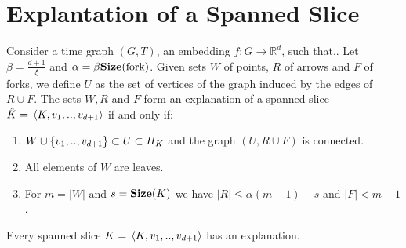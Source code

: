  \section{Explantation of a Spanned Slice}


  \begin{definition}
    Consider a time graph $(G,T)$, an embedding $f \colon G \rightarrow \mathbb{R}^{d}$, such that.. Let $\beta = \frac{d+1}{\xi}$ and $\alpha = \beta \mathbf{Size}(\text{fork})$. Given sets $W$ of points, $R$ of arrows and $F$ of forks, we define $U$ as the set of vertices of the graph induced by the edges of $R \cup F$. The sets $W,R$ and $F$ form an explanation of a spanned slice $\hat{K} = \expval*{ K, v_{1}, .., v_{d+1}}$ if and only if: 
    \begin{enumerate}
      \item $W \cup \{v_{1} ,.., v_{d+1}\} \subset U \subset H_{K}$ and the graph $(U, R\cup F)$ is connected. 
      \item All elements of $W$ are leaves. 
      \item For $m = |W|$ and $s=\mathbf{Size}(K)$ we have $|R| \le \alpha (m-1) - s $ and $|F| < m -1 $. 
    \end{enumerate}
  \end{definition}

  \begin{claim}
    \label{claim:edgesin}
    Every spanned slice $K = \expval*{K,v_{1},..,v_{d+1}}$ has an explanation.
  \end{claim}

